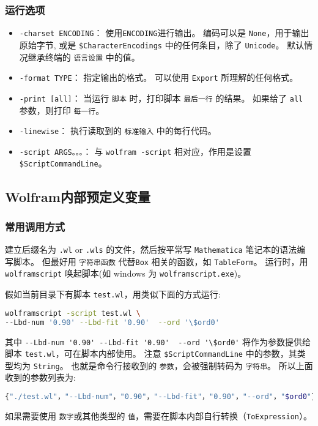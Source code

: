 \subsubsection{运行选项}
\begin{itemize}
\item \verb`-charset ENCODING`： 使用\verb`ENCODING`进行输出。 编码可以是 \verb`None`，用于输出原始字节,
或是 \verb`$CharacterEncodings` 中的任何条目，除了 \verb`Unicode`。 默认情况继承终端的 \verb`语言设置` 中的值。
\item \verb`-format TYPE`： 指定输出的格式。 可以使用 \verb`Export` 所理解的任何格式。
\item \verb`-print [all]`： 当运行 \verb`脚本` 时，打印脚本 \verb`最后一行` 的结果。 如果给了 \verb`all` 参数，则打印 \verb`每一行`。
\item \verb`-linewise`： 执行读取到的 \verb`标准输入` 中的每行代码。
\item \verb`-script ARGS。。。`： 与 \verb`wolfram -script` 相对应，作用是设置 \verb`$ScriptCommandLine`。
\end{itemize}

\subsection{Wolfram内部预定义变量}

\subsubsection{常用调用方式}

建立后缀名为 \verb`.wl` or \verb`.wls` 的文件，然后按平常写 \verb`Mathematica` 笔记本的语法编写脚本。
但最好用 \verb`字符串函数` 代替\verb`Box` 相关的函数，如 \verb`TableForm`。
运行时，用 \verb`wolframscript` 唤起脚本(如 windows 为 \verb`wolframscript.exe`)。

假如当前目录下有脚本 \verb`test.wl`，用类似下面的方式运行:
\begin{lstlisting}[language=bash]
wolframscript -script test.wl \
--Lbd-num '0.90' --Lbd-fit '0.90'  --ord '\$ord0'
\end{lstlisting}

其中 \verb`--Lbd-num '0.90' --Lbd-fit '0.90'  --ord '\$ord0'` 将作为参数提供给脚本 \verb`test.wl`，可在脚本内部使用。
注意 \verb`$ScriptCommandLine` 中的参数，其类型均为 \verb`String`。
也就是命令行接收到的 \verb`参数`，会被强制转码为 \verb`字符串`。
所以上面收到的参数列表为:
\begin{lstlisting}[language=bash]
{"./test.wl"，"--Lbd-num"，"0.90"，"--Lbd-fit"，"0.90"，"--ord"，"$ord0"}
\end{lstlisting}
如果需要使用 \verb`数字`或其他类型的 \verb`值`，需要在脚本内部自行转换（\verb`ToExpression`）。

